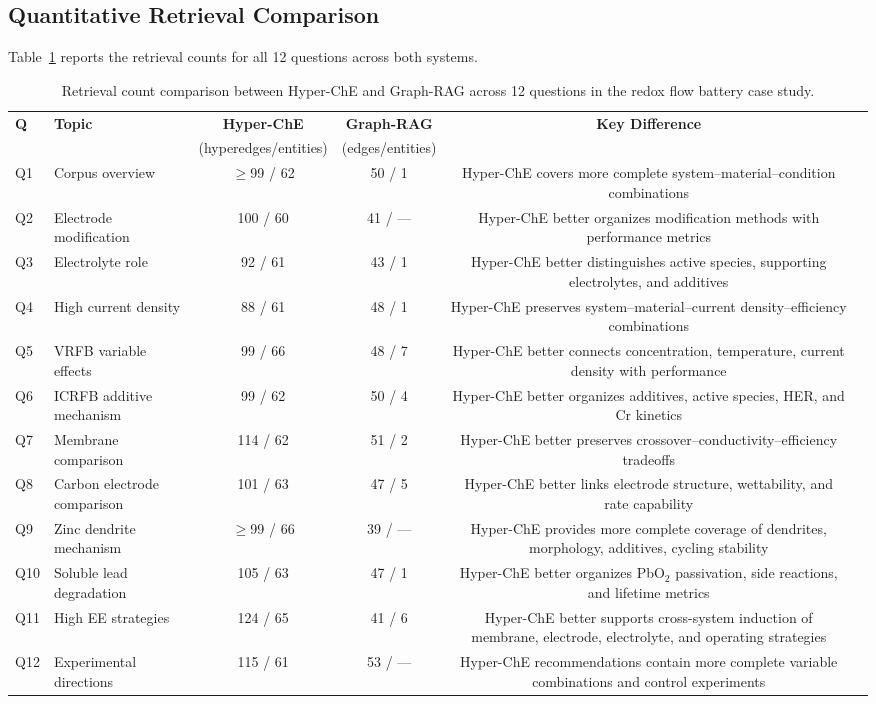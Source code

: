 \documentclass[11pt,a4paper]{article}
\begin{document}
\subsection{Quantitative Retrieval Comparison}
\label{subsec:flow_battery_quantitative}

Table~\ref{tab:retrieval_comparison} reports the retrieval counts for all 12 questions across both systems.

\begin{table}[htbp]
\centering
\caption{Retrieval count comparison between Hyper-ChE and Graph-RAG across 12 questions in the redox flow battery case study.}
\label{tab:retrieval_comparison}
\begin{tabular}{@{}llcccp{4.8cm}@{}}
\toprule
\textbf{Q} & \textbf{Topic} & \textbf{Hyper-ChE} & \textbf{Graph-RAG} & \textbf{Key Difference} \\
 & & (hyperedges/entities) & (edges/entities) & \\
\midrule
Q1 & Corpus overview & $\geq$99 / 62 & 50 / 1 & Hyper-ChE covers more complete system--material--condition combinations \\
Q2 & Electrode modification & 100 / 60 & 41 / --- & Hyper-ChE better organizes modification methods with performance metrics \\
Q3 & Electrolyte role & 92 / 61 & 43 / 1 & Hyper-ChE better distinguishes active species, supporting electrolytes, and additives \\
Q4 & High current density & 88 / 61 & 48 / 1 & Hyper-ChE preserves system--material--current density--efficiency combinations \\
Q5 & VRFB variable effects & 99 / 66 & 48 / 7 & Hyper-ChE better connects concentration, temperature, current density with performance \\
Q6 & ICRFB additive mechanism & 99 / 62 & 50 / 4 & Hyper-ChE better organizes additives, active species, HER, and Cr kinetics \\
Q7 & Membrane comparison & 114 / 62 & 51 / 2 & Hyper-ChE better preserves crossover--conductivity--efficiency tradeoffs \\
Q8 & Carbon electrode comparison & 101 / 63 & 47 / 5 & Hyper-ChE better links electrode structure, wettability, and rate capability \\
Q9 & Zinc dendrite mechanism & $\geq$99 / 66 & 39 / --- & Hyper-ChE provides more complete coverage of dendrites, morphology, additives, cycling stability \\
Q10 & Soluble lead degradation & 105 / 63 & 47 / 1 & Hyper-ChE better organizes PbO$_2$ passivation, side reactions, and lifetime metrics \\
Q11 & High EE strategies & 124 / 65 & 41 / 6 & Hyper-ChE better supports cross-system induction of membrane, electrode, electrolyte, and operating strategies \\
Q12 & Experimental directions & 115 / 61 & 53 / --- & Hyper-ChE recommendations contain more complete variable combinations and control experiments \\
\bottomrule
\end{tabular}
\end{table}
\end{document}
